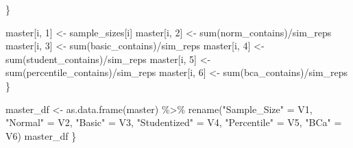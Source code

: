 \documentclass[12pt]{article}
\newenvironment{Shaded}{\begin{snugshade}}{\end{snugshade}}
\newcommand{\DecValTok}[1]{\textcolor[rgb]{0.00,0.00,0.81}{#1}}
\newcommand{\FunctionTok}[1]{\textcolor[rgb]{0.00,0.00,0.00}{#1}}
\newcommand{\NormalTok}[1]{#1}
\newcommand{\OtherTok}[1]{\textcolor[rgb]{0.56,0.35,0.01}{#1}}
\newcommand{\SpecialCharTok}[1]{\textcolor[rgb]{0.00,0.00,0.00}{#1}}
\newcommand{\StringTok}[1]{\textcolor[rgb]{0.31,0.60,0.02}{#1}}
\begin{document}
\begin{Shaded}
\begin{Highlighting}[]
\NormalTok{    \}}
    
\NormalTok{    master[i, }\DecValTok{1}\NormalTok{] }\OtherTok{\textless{}{-}}\NormalTok{ sample\_sizes[i]}
\NormalTok{    master[i, }\DecValTok{2}\NormalTok{] }\OtherTok{\textless{}{-}} \FunctionTok{sum}\NormalTok{(norm\_contains)}\SpecialCharTok{/}\NormalTok{sim\_reps}
\NormalTok{    master[i, }\DecValTok{3}\NormalTok{] }\OtherTok{\textless{}{-}} \FunctionTok{sum}\NormalTok{(basic\_contains)}\SpecialCharTok{/}\NormalTok{sim\_reps}
\NormalTok{    master[i, }\DecValTok{4}\NormalTok{] }\OtherTok{\textless{}{-}} \FunctionTok{sum}\NormalTok{(student\_contains)}\SpecialCharTok{/}\NormalTok{sim\_reps}
\NormalTok{    master[i, }\DecValTok{5}\NormalTok{] }\OtherTok{\textless{}{-}} \FunctionTok{sum}\NormalTok{(percentile\_contains)}\SpecialCharTok{/}\NormalTok{sim\_reps}
\NormalTok{    master[i, }\DecValTok{6}\NormalTok{] }\OtherTok{\textless{}{-}} \FunctionTok{sum}\NormalTok{(bca\_contains)}\SpecialCharTok{/}\NormalTok{sim\_reps}
\NormalTok{  \}}
  
\NormalTok{  master\_df }\OtherTok{\textless{}{-}} \FunctionTok{as.data.frame}\NormalTok{(master) }\SpecialCharTok{\%\textgreater{}\%} 
      \FunctionTok{rename}\NormalTok{(}\StringTok{"Sample\_Size"} \OtherTok{=}\NormalTok{ V1, }\StringTok{"Normal"} \OtherTok{=}\NormalTok{ V2, }\StringTok{"Basic"} \OtherTok{=}\NormalTok{ V3, }\StringTok{"Studentized"} \OtherTok{=}\NormalTok{ V4, }
             \StringTok{"Percentile"} \OtherTok{=}\NormalTok{ V5, }\StringTok{"BCa"} \OtherTok{=}\NormalTok{ V6) }
\NormalTok{  master\_df}
\NormalTok{\}}
\end{Highlighting}
\end{Shaded}
\end{document}
